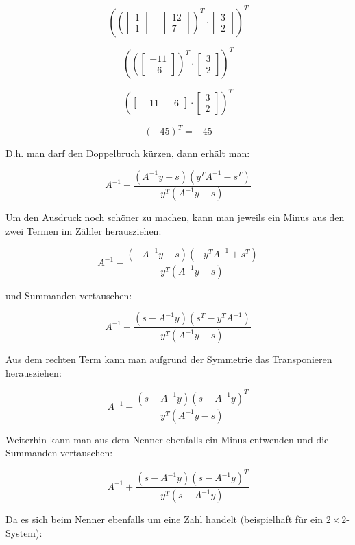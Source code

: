 \documentclass[a4paper, 12pt]{report}
\begin{document}
$$\left( \left(\begin{bmatrix}1\\1\end{bmatrix} - \begin{bmatrix}12\\7\end{bmatrix} \right)^T \cdot \begin{bmatrix}3\\2\end{bmatrix} \right)^T$$

$$\left( \left(\begin{bmatrix}-11\\-6\end{bmatrix} \right)^T \cdot \begin{bmatrix}3\\2\end{bmatrix} \right)^T$$

$$\left( \begin{bmatrix}-11 & -6\end{bmatrix} \cdot \begin{bmatrix}3\\2\end{bmatrix} \right)^T$$

$$\left( -45 \right)^T = -45$$

D.h. man darf den Doppelbruch kürzen, dann erhält man:

$$ A^{-1} - \frac{ (A^{-1}y - s)(y^TA^{-1} - s^T) }{ y^T(A^{-1}y - s) } $$

Um den Ausdruck noch schöner zu machen, kann man jeweils ein Minus aus den zwei Termen im Zähler herausziehen:

$$ A^{-1} - \frac{ (-A^{-1}y + s)(-y^TA^{-1} + s^T) }{ y^T(A^{-1}y - s) } $$

und Summanden vertauschen:

$$ A^{-1} - \frac{ (s - A^{-1}y )(s^T - y^TA^{-1}) }{ y^T(A^{-1}y - s) } $$

Aus dem rechten Term kann man aufgrund der Symmetrie das Transponieren herausziehen:

$$ A^{-1} - \frac{ (s - A^{-1}y )(s - A^{-1}y)^T }{ y^T(A^{-1}y - s) } $$

Weiterhin kann man aus dem Nenner ebenfalls ein Minus entwenden und die Summanden vertauschen:

$$ A^{-1} + \frac{ (s - A^{-1}y )(s - A^{-1}y)^T }{ y^T(s - A^{-1}y) } $$

Da es sich beim Nenner ebenfalls um eine Zahl handelt (beispielhaft für ein $2\times 2$-System):
\end{document}
